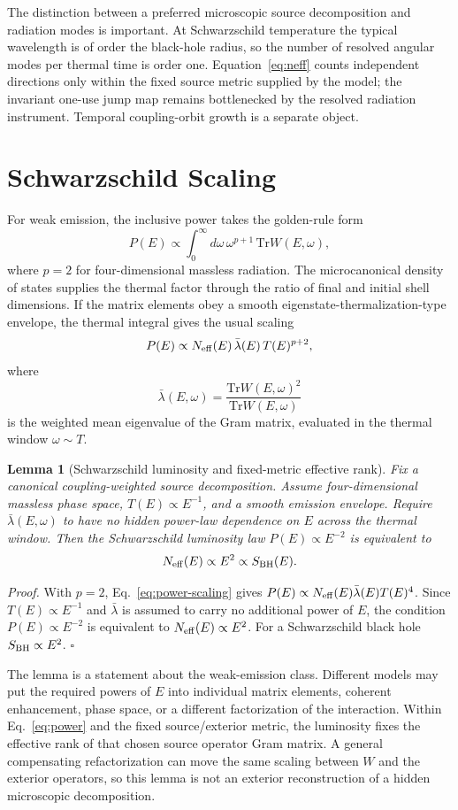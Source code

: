 \documentclass[12pt]{article}
\newtheorem{lemma}{Lemma}
\newcommand{\be}{\begin{equation}}
\newcommand{\ee}{\end{equation}}
\newcommand{\Tr}{\mathrm{Tr}}
\newcommand{\Neff}{N_{\rm eff}}
\begin{document}
The distinction between a preferred microscopic source decomposition and
radiation modes is important.  At Schwarzschild temperature the typical
wavelength is of order the black-hole radius, so the number of resolved
angular modes per thermal time is order one.  Equation~\eqref{eq:neff} counts
independent directions only within the fixed source metric supplied by the
model; the invariant one-use jump map remains bottlenecked by the resolved
radiation instrument.  Temporal coupling-orbit growth is a separate object.

\section{Schwarzschild Scaling}

For weak emission, the inclusive power takes the golden-rule form
\be
  P(E)
  \propto
  \int_0^\infty d\omega\,
  \omega^{p+1}\,\Tr W(E,\omega),
\label{eq:power}
\ee
where $p=2$ for four-dimensional massless radiation.  The
microcanonical density of states supplies the thermal factor through
the ratio of final and initial shell dimensions.  If the matrix
elements obey a smooth eigenstate-thermalization-type envelope, the
thermal integral gives the
usual scaling
\be
  P(E) \propto \Neff(E)\,\bar\lambda(E)\,T(E)^{p+2},
\label{eq:power-scaling}
\ee
where
\be
  \bar\lambda(E,\omega)
  =
  \frac{\Tr W(E,\omega)^2}{\Tr W(E,\omega)}
\ee
is the weighted mean eigenvalue of the Gram matrix, evaluated in the
thermal window $\omega\sim T$.

\begin{lemma}[Schwarzschild luminosity and fixed-metric effective rank]
\label{lem:schwarzschild}
Fix a canonical coupling-weighted source decomposition.  Assume
four-dimensional massless phase space, $T(E)\propto E^{-1}$, and a smooth
emission envelope.  Require $\bar\lambda(E,\omega)$ to have no hidden
power-law dependence on $E$ across the thermal window.
Then the Schwarzschild luminosity law $P(E)\propto E^{-2}$ is equivalent
to
\be
  \Neff(E) \propto E^2 \propto S_{\rm BH}(E).
\ee
\end{lemma}

\emph{Proof.}
With $p=2$, Eq.~\eqref{eq:power-scaling} gives
$P(E)\propto \Neff(E)\bar\lambda(E)T(E)^4$.  Since
$T(E)\propto E^{-1}$ and $\bar\lambda$ is assumed to carry no additional
power of $E$, the condition $P(E)\propto E^{-2}$ is equivalent to
$\Neff(E)\propto E^2$.  For a Schwarzschild black hole
$S_{\rm BH}\propto E^2$.
\hfill$\square$

The lemma is a statement about the weak-emission class.  Different
models may put the required powers of $E$ into individual matrix
elements, coherent enhancement, phase space, or a different
factorization of the interaction.  Within Eq.~\eqref{eq:power} and the fixed
source/exterior metric, the luminosity fixes the effective rank of that chosen
source operator Gram matrix.  A general compensating refactorization can move
the same scaling between $W$ and the exterior operators, so this lemma is not
an exterior reconstruction of a hidden microscopic decomposition.
\end{document}
